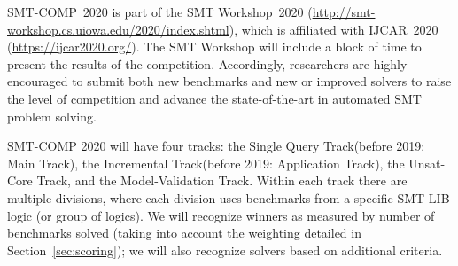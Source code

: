 \documentclass[12pt]{article}
\newcommand{\maintrack}{Single Query Track\xspace}
\newcommand{\inctrack}{Incremental Track\xspace}
\newcommand{\ucoretrack}{Unsat-Core Track\xspace}
\newcommand{\mvaltrack}{Model-Validation Track\xspace}
\begin{document}
SMT-COMP~2020 is part of the SMT Workshop~2020
(\url{http://smt-workshop.cs.uiowa.edu/2020/index.shtml}),
which is affiliated with IJCAR~2020 (\url{https://ijcar2020.org/}).
The SMT Workshop will include a block of time to present the results of the
competition.
%
Accordingly, researchers are highly encouraged to submit both new
benchmarks and new or improved solvers to raise the level of
competition and advance the state-of-the-art in automated SMT problem
solving.

SMT-COMP 2020 will have four tracks: the \maintrack (before 2019: Main Track),
the \inctrack (before 2019: Application Track), the \ucoretrack, and the
\mvaltrack.
%
Within each track there are multiple divisions, where each division
uses benchmarks from a specific SMT-LIB logic (or group of logics).
We will recognize winners as measured by number of benchmarks solved
(taking into account the weighting detailed in
Section~\ref{sec:scoring}); we will also recognize solvers based on
additional criteria.
\end{document}

